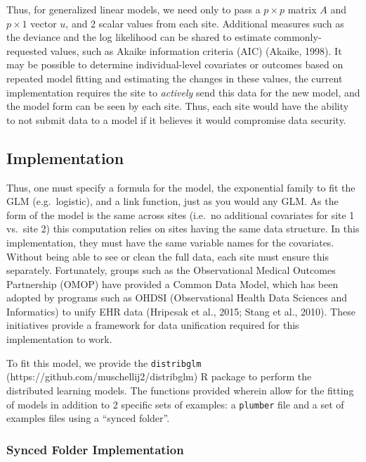 \documentclass[]{elsarticle} %
\begin{document}
Thus, for generalized linear models, we need only to pass a \(p\times{p}\) matrix \(A\) and \(p\times{1}\) vector \(u\), and 2 scalar values from each site. Additional measures such as the deviance and the log likelihood can be shared to estimate commonly-requested values, such as Akaike information criteria (AIC) (Akaike, 1998). It may be possible to determine individual-level covariates or outcomes based on repeated model fitting and estimating the changes in these values, the current implementation requires the site to \emph{actively} send this data for the new model, and the model form can be seen by each site. Thus, each site would have the ability to not submit data to a model if it believes it would compromise data security.

\hypertarget{implementation}{%
\subsection{Implementation}\label{implementation}}

Thus, one must specify a formula for the model, the exponential family to fit the GLM (e.g.~logistic), and a link function, just as you would any GLM. As the form of the model is the same across sites (i.e.~no additional covariates for site 1 vs.~site 2) this computation relies on sites having the same data structure. In this implementation, they must have the same variable names for the covariates. Without being able to see or clean the full data, each site must ensure this separately. Fortunately, groups such as the Observational Medical Outcomes Partnership (OMOP) have provided a Common Data Model, which has been adopted by programs such as OHDSI (Observational Health Data Sciences and Informatics) to unify EHR data (Hripcsak et al., 2015; Stang et al., 2010). These initiatives provide a framework for data unification required for this implementation to work.

To fit this model, we provide the \texttt{distribglm} (https://github.com/muschellij2/distribglm) R package to perform the distributed learning models. The functions provided wherein allow for the fitting of models in addition to 2 specific sets of examples: a \texttt{plumber} file and a set of examples files using a ``synced folder''.

\hypertarget{synced-folder-implementation}{%
\subsubsection{Synced Folder Implementation}\label{synced-folder-implementation}}
\end{document}

